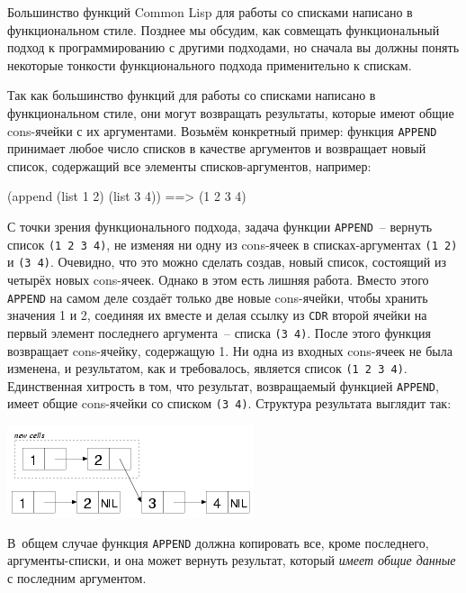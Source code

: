 Большинство функций Common Lisp для работы со списками написано в функциональном
стиле. Позднее мы обсудим, как совмещать функциональный подход к программированию с другими
подходами, но сначала вы должны понять некоторые тонкости функционального подхода
применительно к спискам.

Так как большинство функций для работы со списками написано в функциональном стиле, они могут
возвращать результаты, которые имеют общие cons-ячейки с их аргументами. Возьмём
конкретный пример: функция \lstinline{APPEND} принимает любое число списков в качестве
аргументов и возвращает новый список, содержащий все элементы списков-аргументов,
например:

\begin{myverb}
(append (list 1 2) (list 3 4)) ==> (1 2 3 4)
\end{myverb}

С точки зрения функционального подхода, задача функции \lstinline{APPEND}~-- вернуть список
\lstinline{(1 2 3 4)}, не изменяя ни одну из cons-ячеек в списках-аргументах \lstinline{(1 2)} и
\lstinline{(3 4)}. Очевидно, что это можно сделать создав, новый список, состоящий из четырёх
новых cons-ячеек. Однако в этом есть лишняя работа. Вместо этого \lstinline{APPEND} на самом
деле создаёт только две новые cons-ячейки, чтобы хранить значения 1 и 2, соединяя их
вместе и делая ссылку из \lstinline{CDR} второй ячейки на первый элемент последнего аргумента~--
списка \lstinline{(3 4)}. После этого функция возвращает cons-ячейку, содержащую 1. Ни одна из
входных cons-ячеек не была изменена, и результатом, как и требовалось, является список
\lstinline{(1 2 3 4)}. Единственная хитрость в том, что результат, возвращаемый функцией
\lstinline{APPEND}, имеет общие cons-ячейки со списком \lstinline{(3 4)}. Структура результата
выглядит так:

\begin{center}
  \includegraphics[scale=0.6]{images/after-append.png}
\end{center}

В~общем случае функция \lstinline{APPEND} должна копировать все, кроме последнего,
аргументы-списки, и она может вернуть результат, который \textit{имеет общие данные} с
последним аргументом.

